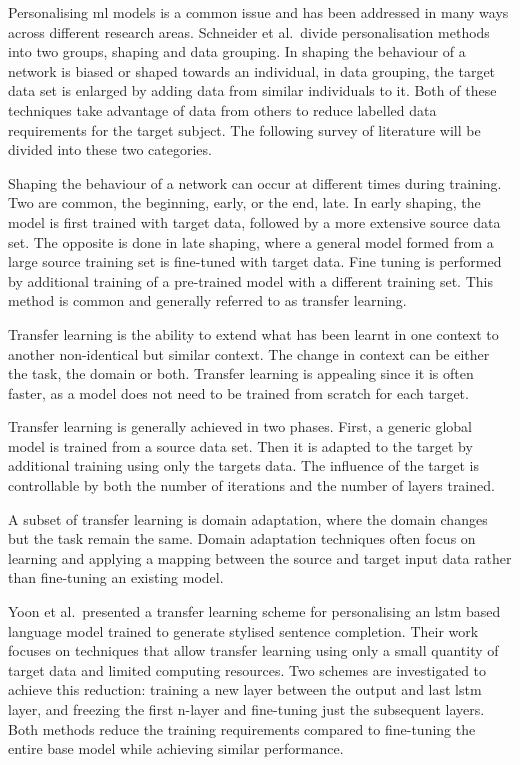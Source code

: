Personalising \acrshort{ml} models is a common issue and has been addressed in many ways across different research areas\cite{Mairittha2021, Tomanek2021}. Schneider et al.~divide personalisation methods into two groups, shaping and data grouping\cite{Schneider2021}. In shaping the behaviour of a network is biased or shaped towards an individual, in data grouping, the target data set is enlarged by adding data from similar individuals to it. Both of these techniques take advantage of data from others to reduce labelled data requirements for the target subject\cite{Shor2020}. The following survey of literature will be divided into these two categories.

Shaping the behaviour of a network can occur at different times during training. Two are common, the beginning, early, or the end, late. In early shaping, the model is first trained with target data, followed by a more extensive source data set. The opposite is done in late shaping, where a general model formed from a large source training set is fine-tuned with target data. Fine tuning is performed by additional training of a pre-trained model with a different training set. This method is common and generally referred to as transfer learning.\cite{Schneider2021}

Transfer learning is the ability to extend what has been learnt in one context to another non-identical but similar context\cite{Fallahzadeh2017}. The change in context can be either the task, the domain or both. Transfer learning is appealing since it is often faster, as a model does not need to be trained from scratch for each target.

Transfer learning is generally achieved in two phases. First, a generic global model is trained from a source data set. Then it is adapted to the target by additional training using only the targets data. The influence of the target is controllable by both the number of iterations and the number of layers trained.\cite{Schneider2021, Mireshghallah2021}

A subset of transfer learning is domain adaptation, where the domain changes but the task remain the same\cite{Goodfellow2015}. Domain adaptation techniques often focus on learning and applying a mapping between the source and target input data rather than fine-tuning an existing model.

Yoon et al.~presented a transfer learning scheme for personalising an \acrshort{lstm} based language model trained to generate stylised sentence completion. Their work focuses on techniques that allow transfer learning using only a small quantity of target data and limited computing resources. Two schemes are investigated to achieve this reduction: training a new layer between the output and last \acrshort{lstm} layer, and freezing the first n-layer and fine-tuning just the subsequent layers. Both methods reduce the training requirements compared to fine-tuning the entire base model while achieving similar performance.\cite{Yoon2017}

